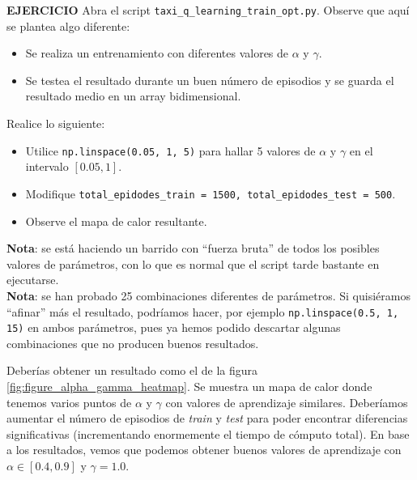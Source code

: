 \documentclass{article}
\begin{document}
\begin{exercise}
\textbf{EJERCICIO}
Abra el script \texttt{taxi\_q\_learning\_train\_opt.py}. Observe que aquí se plantea algo diferente: 
\begin{itemize}
    \item Se realiza un entrenamiento con diferentes valores de $\alpha$ y $\gamma$.
    \item Se testea el resultado durante un buen número de episodios y se guarda el resultado medio en un array bidimensional.
\end{itemize}

Realice lo siguiente:
\begin{itemize}
    \item Utilice \texttt{np.linspace(0.05, 1, 5)} para hallar 5 valores de $\alpha$ y $\gamma$ en el intervalo $[0.05, 1]$.
    \item Modifique \texttt{total\_epidodes\_train = 1500, total\_epidodes\_test = 500}.
    \item Observe el mapa de calor resultante.
\end{itemize}
\textbf{Nota}: se está haciendo un barrido con ``fuerza bruta'' de todos los posibles valores de parámetros, con lo que es normal que el script tarde bastante en ejecutarse.\\
\textbf{Nota}: se han probado 25 combinaciones diferentes de parámetros. Si quisiéramos ``afinar'' más el resultado, podríamos hacer, por ejemplo \texttt{np.linspace(0.5, 1, 15)} en ambos parámetros, pues ya hemos podido descartar algunas combinaciones que no producen buenos resultados.
\end{exercise}

Deberías obtener un resultado como el de la figura \ref{fig:figure_alpha_gamma_heatmap}. Se muestra un mapa de calor donde tenemos varios puntos de $\alpha$ y $\gamma$ con valores de aprendizaje similares. Deberíamos aumentar el número de episodios de \textit{train} y \textit{test} para poder encontrar diferencias significativas (incrementando enormemente el tiempo de cómputo total). En base a los resultados, vemos que podemos obtener buenos valores de aprendizaje con $\alpha \in [0.4, 0.9]$ y $\gamma=1.0$.
\end{document}
